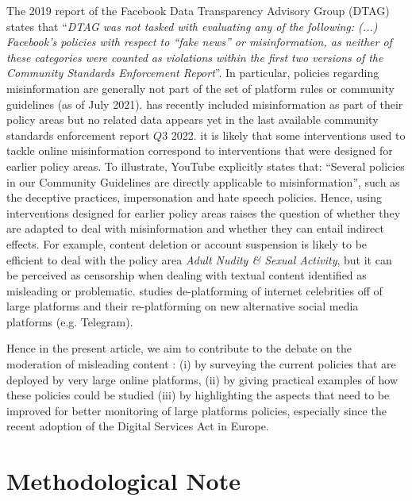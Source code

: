 \documentclass[Afour,sageh,times]{sagej}
\begin{document}
The 2019 report of the Facebook Data Transparency Advisory Group (DTAG) states that ``{\it DTAG was not tasked with evaluating any of the following: (...) Facebook’s policies with respect to “fake news” or misinformation, as neither of these categories were counted as violations within the first two versions of the Community Standards Enforcement Report}''. In particular, policies regarding misinformation are generally not part of the set of platform rules or community guidelines (as of July 2021). \cite{facebookmisinfo2022} has recently included misinformation as part of their policy areas but no related data appears yet in the last available community standards enforcement report $Q3$ 2022. it is likely that some interventions used to tackle online misinformation correspond to interventions that were designed for earlier policy areas. To illustrate, YouTube explicitly states that: ``Several policies in our Community Guidelines are directly applicable to misinformation'', such as the deceptive practices, impersonation and hate speech policies. Hence, using interventions designed for earlier policy areas raises the question of whether they are adapted to deal with misinformation and whether they can entail indirect effects. For example, content deletion or account suspension is likely to be efficient to deal with the policy area {\it Adult Nudity \& Sexual Activity}, but it can be perceived as censorship when dealing with textual content identified as misleading or problematic. \cite{rogers2020} studies de-platforming of internet celebrities off of large platforms and their re-platforming on new alternative social media platforms (e.g. Telegram). 

Hence in the present article, we aim to contribute to the debate on the moderation of misleading content : (i) by surveying the current policies that are deployed by very large online platforms, (ii) by giving practical examples of how these policies could be studied  (iii) by highlighting the aspects that need to be improved for better monitoring of large platforms policies, especially since the recent adoption of the Digital Services Act in Europe. 

\section{Methodological Note}
\end{document}

